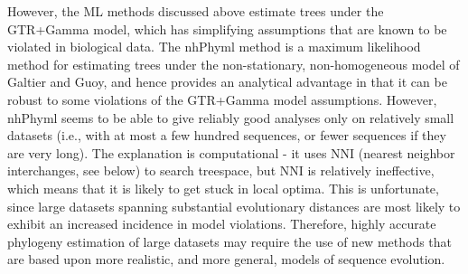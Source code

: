 However, the ML methods discussed above estimate trees under 
the GTR+Gamma model, which has simplifying assumptions that 
are known to be violated in biological data. 
The nhPhyml method is a maximum likelihood method for 
estimating trees under the non-stationary, non-homogeneous 
model of Galtier and Guoy, and hence provides an 
analytical advantage in that it can be robust to some 
violations of the GTR+Gamma model assumptions. However, 
nhPhyml seems to be able to give reliably good analyses 
only on relatively small datasets (i.e., with at most a 
few hundred sequences, or fewer sequences if they are very long). 
The explanation is computational - it uses NNI 
(nearest neighbor interchanges, see below) to search treespace, 
but NNI is relatively ineffective, which means that it is 
likely to get stuck in local optima. This is unfortunate, 
since large datasets spanning substantial evolutionary 
distances are most likely to exhibit an increased incidence 
in model violations. Therefore, highly accurate phylogeny 
estimation of large datasets may require the use of new 
methods that are based upon more realistic, and more general, 
models of sequence evolution.

% 
% 

